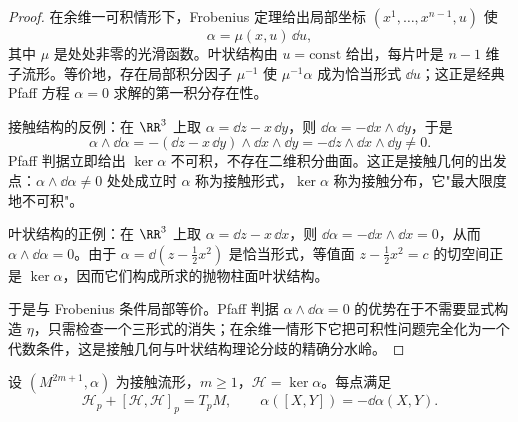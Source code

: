 \begin{proof}
在余维一可积情形下，Frobenius 定理给出局部坐标 $(x^1,\ldots,x^{n-1},u)$ 使
\begin{equation*}
\alpha=\mu(x,u)\,\dd u,
\end{equation*}
其中 $\mu$ 是处处非零的光滑函数。叶状结构由 $u=\text{const}$ 给出，每片叶是 $n-1$ 维子流形。等价地，存在局部积分因子 $\mu^{-1}$ 使 $\mu^{-1}\alpha$ 成为恰当形式 $\dd u$；这正是经典 Pfaff 方程 $\alpha=0$ 求解的第一积分存在性。

接触结构的反例：在 $\RR^3$ 上取 $\alpha=\dd z-x\,\dd y$，则 $\dd\alpha=-\dd x\wedge\dd y$，于是
\begin{equation*}
\alpha\wedge\dd\alpha
=-(\dd z-x\,\dd y)\wedge\dd x\wedge\dd y
=-\dd z\wedge\dd x\wedge\dd y\neq0.
\end{equation*}
Pfaff 判据立即给出 $\ker\alpha$ 不可积，不存在二维积分曲面。这正是接触几何的出发点：$\alpha\wedge\dd\alpha\neq0$ 处处成立时 $\alpha$ 称为接触形式，$\ker\alpha$ 称为接触分布，它"最大限度地不可积"。

叶状结构的正例：在 $\RR^3$ 上取 $\alpha=\dd z-x\,\dd x$，则 $\dd\alpha=-\dd x\wedge\dd x=0$，从而 $\alpha\wedge\dd\alpha=0$。由于 $\alpha=\dd(z-\tfrac12x^2)$ 是恰当形式，等值面 $z-\tfrac12x^2=c$ 的切空间正是 $\ker\alpha$，因而它们构成所求的抛物柱面叶状结构。

于是与 Frobenius 条件局部等价。Pfaff 判据 $\alpha\wedge\dd\alpha=0$ 的优势在于不需要显式构造 $\eta$，只需检查一个三形式的消失；在余维一情形下它把可积性问题完全化为一个代数条件，这是接触几何与叶状结构理论分歧的精确分水岭。
\end{proof}

\begin{proposition}[接触分布的两步括号生成性]
设 $(M^{2m+1},\alpha)$ 为接触流形，$m\ge1$，$\mathcal H=\ker\alpha$。每点满足\[\mathcal H_p+[\mathcal H,\mathcal H]_p=T_pM,\qquad\alpha([X,Y])=-\dd\alpha(X,Y).\]
\end{proposition}

